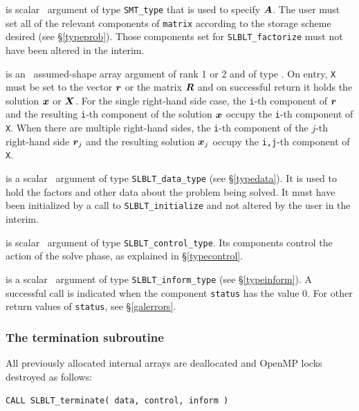 \documentclass{galahad}
\newcommand{\packagename}{SLBLT}
\begin{document}
\begin{description}

 is scalar \intentin\ argument of type {\tt SMT\_type}
that is used to specify ${\bm{A}}$.
The user must set all of the relevant components of {\tt matrix} according
to the storage scheme desired (see \S\ref{typeprob}). Those components
set for {\tt \packagename\_factorize} must not have been altered in the interim.

 is an \intentinout\ assumed-shape array argument of rank 1 or 2
and of type \realdp.  On entry, {\tt X} must be set
to the vector ${\bm{r}}$ or the matrix ${\bm{R}}$ and on successful return it holds
the solution ${\bm{x}}$ or ${\bm{X}}$. For the single right-hand side case, the
{\tt i}-th component of ${\bm{r}}$ and the resulting
{\tt i}-th component of the solution ${\bm{x}}$
occupy the {\tt i}-th component of {\tt X}. When there are multiple
right-hand sides, the
{\tt i}-th component of the $j$-th right-hand side ${\bm{r}}_j$
and the resulting solution ${\bm{x}}_j$ occupy the
{\tt i,j}-th component of {\tt X}.

 is a scalar \intentinout\ argument of type
{\tt \packagename\_data\_type}
(see \S\ref{typedata}). It is used to hold the factors and other
data about the problem being solved.
It must have been initialized by a call to
{\tt \packagename\_ini\-tialize} and not altered by the user in the interim.

 is scalar \intentin\ argument of type
{\tt \packagename\_control\_type}. Its components control the action
of the solve phase, as explained in
\S\ref{typecontrol}.

 is a scalar \intentinout\ argument of type
{\tt \packagename\_inform\_type}
(see \S\ref{typeinform}).
A successful call is indicated when the  component {\tt status} has the value 0.
For other return values of {\tt status}, see \S\ref{galerrors}.

\end{description}


\subsubsection{The termination subroutine}
All previously allocated internal arrays are deallocated and OpenMP locks
destroyed as follows:

\hskip0.5in
{\tt CALL \packagename\_terminate( data, control, inform )}
\end{document}
